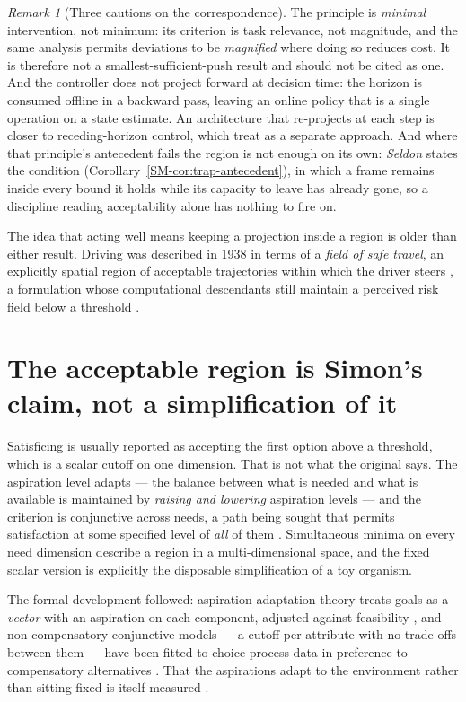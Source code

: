 \documentclass[11pt,a4paper]{article}
\theoremstyle{remark}
\newtheorem{remark}{Remark}[section]
\begin{document}
\begin{remark}[Three cautions on the correspondence]\label{rem:mip-cautions}
The principle is \emph{minimal} intervention, not minimum: its criterion is task relevance, not
magnitude, and the same analysis permits deviations to be \emph{magnified} where doing so reduces
cost. It is therefore not a smallest-sufficient-push result and should not be cited as one. And the
controller does not project forward at decision time: the horizon is consumed offline in a backward
pass, leaving an online policy that is a single operation on a state estimate. An architecture that
re-projects at each step is closer to receding-horizon control, which \citet{todorov2002} treat as a
separate approach. And where that principle's antecedent fails the region is not enough on its own:
\emph{Seldon} states the condition (Corollary~\ref{SM-cor:trap-antecedent}), in which a frame remains
inside every bound it holds while its capacity to leave has already gone, so a discipline reading
acceptability alone has nothing to fire on.
\end{remark}

The idea that acting well means keeping a projection inside a region is older than either result.
Driving was described in 1938 in terms of a \emph{field of safe travel}, an explicitly spatial
region of acceptable trajectories within which the driver steers \citep{gibsoncrooks1938}, a
formulation whose computational descendants still maintain a perceived risk field below a threshold
\citep{kolekar2020}.

\section{The acceptable region is Simon's claim, not a simplification of it}\label{sec:satisficing}
Satisficing is usually reported as accepting the first option above a threshold, which is a scalar
cutoff on one dimension. That is not what the original says. The aspiration level adapts --- the
balance between what is needed and what is available is maintained by \emph{raising and lowering}
aspiration levels --- and the criterion is conjunctive across needs, a path being sought that permits
satisfaction at some specified level of \emph{all} of them \citep{simon1956}. Simultaneous minima on
every need dimension describe a region in a multi-dimensional space, and the fixed scalar version is
explicitly the disposable simplification of a toy organism.

The formal development followed: aspiration adaptation theory treats goals as a \emph{vector} with an
aspiration on each component, adjusted against feasibility \citep{selten1998}, and non-compensatory
conjunctive models --- a cutoff per attribute with no trade-offs between them --- have been fitted to
choice process data in preference to compensatory alternatives \citep{einhorn1970,stuttgen2012}.
That the aspirations adapt to the environment rather than sitting fixed is itself measured
\citep{caplin2011}.
\end{document}
